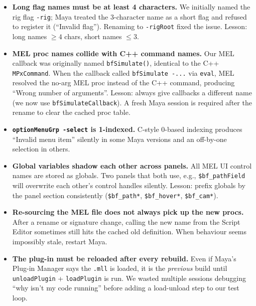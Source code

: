 \documentclass[12pt]{article}
\begin{document}
\begin{itemize}
  \item \textbf{Long flag names must be at least 4 characters.}  We initially
    named the rig flag \texttt{-rig}; Maya treated the 3-character name as a
    short flag and refused to register it (``Invalid flag'').  Renaming to
    \texttt{-rigRoot} fixed the issue.  Lesson: long names $\geq 4$ chars,
    short names $\leq 3$.

  \item \textbf{MEL proc names collide with C++ command names.}  Our MEL
    callback was originally named \texttt{bfSimulate()}, identical to the
    C++ \texttt{MPxCommand}.  When the callback called \texttt{bfSimulate -...}
    via \texttt{eval}, MEL resolved the no-arg MEL proc instead of the C++
    command, producing ``Wrong number of arguments''.  Lesson: always give
    callbacks a different name (we now use \texttt{bfSimulateCallback}).
    A fresh Maya session is required after the rename to clear the cached
    proc table.

  \item \textbf{\texttt{optionMenuGrp -select} is 1-indexed.}  C-style 0-based
    indexing produces ``Invalid menu item'' silently in some Maya versions
    and an off-by-one selection in others.

  \item \textbf{Global variables shadow each other across panels.}  All MEL
    UI control names are stored as globals.  Two panels that both use, e.g.,
    \texttt{\$bf\_pathField} will overwrite each other's control handles
    silently.  Lesson: prefix globals by the panel section consistently
    (\texttt{\$bf\_path*}, \texttt{\$bf\_hover*}, \texttt{\$bf\_cam*}).

  \item \textbf{Re-sourcing the MEL file does not always pick up the new
    procs.}  After a rename or signature change, calling the new name from
    the Script Editor sometimes still hits the cached old definition.  When
    behaviour seems impossibly stale, restart Maya.

  \item \textbf{The plug-in must be reloaded after every rebuild.}  Even if
    Maya's Plug-in Manager says the \texttt{.mll} is loaded, it is the
    \emph{previous} build until \texttt{unloadPlugin} + \texttt{loadPlugin}
    is run.  We wasted multiple sessions debugging ``why isn't my code
    running'' before adding a load-unload step to our test loop.
\end{itemize}
\end{document}

